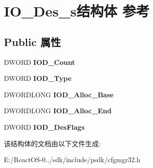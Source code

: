 \hypertarget{struct_i_o___des__s}{}\section{I\+O\+\_\+\+Des\+\_\+s结构体 参考}
\label{struct_i_o___des__s}
\subsection*{Public 属性}
\begin{DoxyCompactItemize}
\item 
\mbox{\label{struct_i_o___des__s_a6bbae0f4c70aa37d8e63522a39a8b98b}} 
D\+W\+O\+RD {\bfseries I\+O\+D\+\_\+\+Count}
\item 
\mbox{\label{struct_i_o___des__s_aac348975667010c60a36e3a39a7128ea}} 
D\+W\+O\+RD {\bfseries I\+O\+D\+\_\+\+Type}
\item 
\mbox{\label{struct_i_o___des__s_a788c27de4f6b70f9a84135847b30a8a1}} 
D\+W\+O\+R\+D\+L\+O\+NG {\bfseries I\+O\+D\+\_\+\+Alloc\+\_\+\+Base}
\item 
\mbox{\label{struct_i_o___des__s_a527b099dd554764efb99782ab4b3dcb2}} 
D\+W\+O\+R\+D\+L\+O\+NG {\bfseries I\+O\+D\+\_\+\+Alloc\+\_\+\+End}
\item 
\mbox{\label{struct_i_o___des__s_a1c4b145065eafadb1131383a564daafa}} 
D\+W\+O\+RD {\bfseries I\+O\+D\+\_\+\+Des\+Flags}
\end{DoxyCompactItemize}


该结构体的文档由以下文件生成\+:\begin{DoxyCompactItemize}
\item 
E\+:/\+React\+O\+S-\/0../sdk/include/psdk/cfgmgr32.\+h\end{DoxyCompactItemize}
